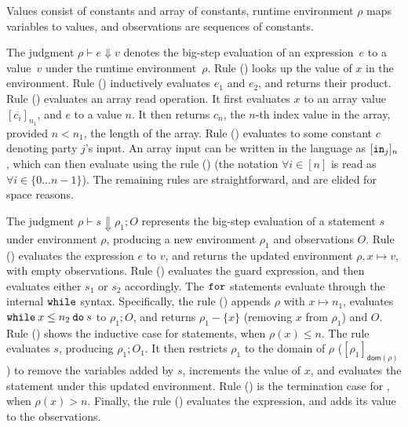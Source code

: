 \vspace{0.1cm}
Values consist of constants and array of constants, runtime environment
$\rho$ maps variables to values, and observations are sequences of
constants.

The judgment $\rho \vdash e \Downarrow v$ denotes the big-step
evaluation of an expression~$e$ to a value~$v$ under the runtime
environment~$\rho$. Rule ({}) looks up the value of $x$ in
the environment. Rule ({}) inductively evaluates $e_{1}$ and
$e_{2}$, and returns their product. Rule ({})
evaluates an array read operation. It first evaluates $x$ to an array
value $[\overline{c_{i}}]_{n_{1}}$, and $e$ to a  value
$n$. It then returns $c_{n}$, the $n$-th index value in the array,
provided $n < n_{1}$, the length of the array. Rule ({})
evaluates to some constant $c$ denoting party $j$'s input. 
An array input can be written in the
language as $[{\mathtt{in}}_{j}]_{n}$, which can then evaluate using the
rule ({}) (the notation $\forall i \in [n]$ is read
  as $\forall i \in \{0\dots n - 1\}$). The remaining rules are
straightforward, and are elided for space reasons.

The judgment $\rho \vdash s \Downarrow \rho_{1}; O$ represents the
big-step evaluation of a statement $s$ under environment $\rho$,
producing a new environment $\rho_{1}$ and observations $O$. Rule
({}) evaluates the expression $e$ to $v$, and returns the
updated environment $\rho,x \mapsto v$, with empty observations. Rule
({}) evaluates the guard expression, and then evaluates
either $s_{1}$ or $s_{2}$ accordingly. The ${\mathtt{for}}$ statements evaluate
through the internal ${\mathtt{while}}$ syntax. Specifically, the rule
({}) appends $\rho$ with $x\mapsto n_{1}$,
evaluates ${\mathtt{while}}\:{x} \leq {n_{2}}\:{\mathtt{do}}\:{s}$ to $\rho_{1}; O$, and returns
$\rho_{1} - \{x\}$ (removing $x$ from $\rho_{1}$) and $O$. Rule
({}) shows the inductive case for 
statements, when $\rho(x) \leq n$. The rule evaluates $s$, producing
$\rho_{1}; O_{1}$. It then restricts $\rho_{1}$ to the domain of
$\rho$ ($[\rho_{1}]_{\mathsf{dom}(\rho)}$) to remove the variables
added by $s$, increments the value of $x$, and evaluates the
 statement under this updated environment. Rule
({}) is the termination case for ,
when $\rho(x) > n$. Finally, the rule ({}) evaluates the
expression, and adds its value to the observations.

\newcommand{\lcond}[4]{\ensuremath{{{#2}\:?_{{#1}}\:{#3}\::{#4}}}}

